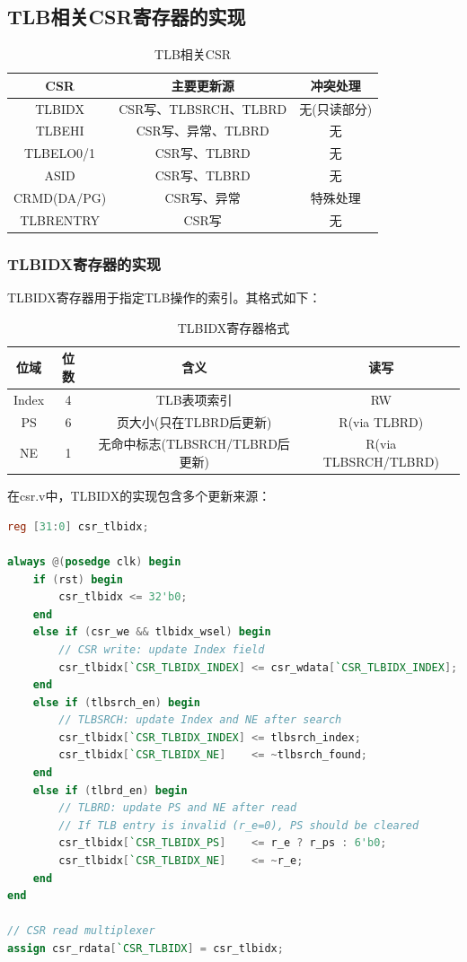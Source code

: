 \subsection{TLB相关CSR寄存器的实现}

\begin{table}[h]
\centering
\caption{TLB相关CSR}
\begin{tabular}{|c|c|c|}
\hline
	\textbf{CSR} & \textbf{主要更新源} & \textbf{冲突处理} \\
\hline
TLBIDX & CSR写、TLBSRCH、TLBRD & 无(只读部分) \\
\hline
TLBEHI & CSR写、异常、TLBRD & 无 \\
\hline
TLBELO0/1 & CSR写、TLBRD & 无 \\
\hline
ASID & CSR写、TLBRD & 无 \\
\hline
CRMD(DA/PG) & CSR写、异常 & 特殊处理 \\
\hline
TLBRENTRY & CSR写 & 无 \\
\hline
\end{tabular}
\end{table}

\subsubsection{TLBIDX寄存器的实现}

TLBIDX寄存器用于指定TLB操作的索引。其格式如下：

\begin{table}[h]
\centering
\caption{TLBIDX寄存器格式}
\begin{tabular}{|c|c|c|c|}
\hline
\textbf{位域} & \textbf{位数} & \textbf{含义} & \textbf{读写} \\
\hline
Index & 4 & TLB表项索引 & RW \\
\hline
PS & 6 & 页大小(只在TLBRD后更新) & R(via TLBRD) \\
\hline
NE & 1 & 无命中标志(TLBSRCH/TLBRD后更新) & R(via TLBSRCH/TLBRD) \\
\hline
\end{tabular}
\end{table}

在csr.v中，TLBIDX的实现包含多个更新来源：

\begin{lstlisting}[language=Verilog, caption=TLBIDX寄存器实现]
reg [31:0] csr_tlbidx;

always @(posedge clk) begin
    if (rst) begin
        csr_tlbidx <= 32'b0;
    end
    else if (csr_we && tlbidx_wsel) begin
        // CSR write: update Index field
        csr_tlbidx[`CSR_TLBIDX_INDEX] <= csr_wdata[`CSR_TLBIDX_INDEX];
    end
    else if (tlbsrch_en) begin
        // TLBSRCH: update Index and NE after search
        csr_tlbidx[`CSR_TLBIDX_INDEX] <= tlbsrch_index;
        csr_tlbidx[`CSR_TLBIDX_NE]    <= ~tlbsrch_found;
    end
    else if (tlbrd_en) begin
        // TLBRD: update PS and NE after read
        // If TLB entry is invalid (r_e=0), PS should be cleared
        csr_tlbidx[`CSR_TLBIDX_PS]    <= r_e ? r_ps : 6'b0;
        csr_tlbidx[`CSR_TLBIDX_NE]    <= ~r_e;
    end
end

// CSR read multiplexer
assign csr_rdata[`CSR_TLBIDX] = csr_tlbidx;
\end{lstlisting}


